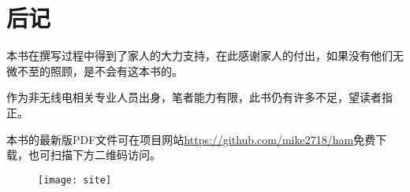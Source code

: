 \chapter*{后记}

本书在撰写过程中得到了家人的大力支持，在此感谢家人的付出，如果没有他们无微不至的照顾，是不会有这本书的。

作为非无线电相关专业人员出身，笔者能力有限，此书仍有许多不足，望读者指正。

本书的最新版PDF文件可在项目网站\url{https://github.com/mike2718/ham}免费下载，也可扫描下方二维码访问。

\begin{figure}[h]
	\texttt{[image: site]}
	\centering
\end{figure}

\newpage
